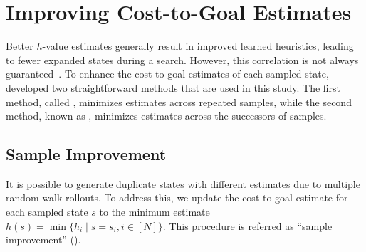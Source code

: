 \documentclass[ppgc,diss,english]{iiufrgs}
\newtheorem{property}{Property}
\begin{document}
\section{Improving Cost-to-Goal Estimates}
\label{sec:sample-improving-h}



Better $h$-value estimates generally result in improved learned heuristics, leading to fewer expanded states during a search. However, this correlation is not always guaranteed~\cite{Holte/2010}. To enhance the cost-to-goal estimates of each sampled state,~\citet{Bettker.etal/2022} developed two straightforward methods that are used in this study. The first method, called \sai, minimizes estimates across repeated samples, while the second method, known as \sui, minimizes estimates across the successors of samples.


\subsection{Sample Improvement}
\label{sec:sample-sai}
It is possible to generate duplicate states with different estimates due to multiple random walk rollouts. To address this, we update the cost-to-goal estimate for each sampled state $s$ to the minimum estimate $h(s) = \min\{h_i \mid s=s_i, i\in[N]\}$.
This procedure is referred as ``sample improvement'' (\sai).
\end{document}
